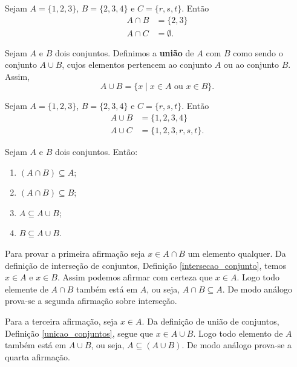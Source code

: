 \begin{exemplo}
	Sejam $A = \{1, 2, 3\}$, $B = \{2, 3, 4\}$ e $C = \{r, s, t\}$. Então
	\begin{align*}
		A \cap B &= \{2, 3\}\\
		A \cap C &= \emptyset.
	\end{align*}
\end{exemplo}

\begin{definicao}[Uni{\~a}o]\label{unicao_conjuntos}
Sejam $A$ e $B$ dois conjuntos. Definimos a \textbf{uni{\~a}o} de $A$ com $B$ como sendo o conjunto $A \cup B$, cujos elementos pertencem ao conjunto $A$ ou ao conjunto $B$. Assim,
\[
A \cup B = \{x \mid x \in A \mbox{ ou } x \in B\}.
\]
\end{definicao}

\begin{exemplo}
	Sejam $A = \{1, 2, 3\}$, $B = \{2, 3, 4\}$ e $C = \{r, s, t\}$. Então
	\begin{align*}
		A \cup B &= \{1,2,3,4\}\\
		A \cup C &= \{1,2,3,r,s,t\}.
	\end{align*}
\end{exemplo}

\begin{proposicao} Sejam $A$ e $B$ dois conjuntos. Ent{\~a}o:
\begin{enumerate}
\item $(A \cap B) \subseteq A$;
\item $(A \cap B) \subseteq B$;
\item $A \subseteq A \cup B$;
\item $B \subseteq A \cup B$.
\end{enumerate}
\end{proposicao}
\begin{prova}
	Para provar a primeira afirmação seja $x \in A \cap B$ um elemento qualquer. Da defini\c{c}\~ao de interse\c{c}\~ao de conjuntos, Definição \ref{intersecao_conjunto}, temos $x \in A$ e $x \in B$. Assim podemos afirmar com certeza que $x \in A$. Logo todo elemente de $A \cap B$ também está em $A$, ou seja, $A \cap B \subseteq A$. De modo análogo prova-se a segunda afirmação sobre interseção.

	Para a terceira afirmação, seja $x \in A$. Da definição de união de conjuntos, Definição \ref{unicao_conjuntos}, segue que $x \in A \cup B$. Logo todo elemento de $A$ também está em $A \cup B$, ou seja, $A \subseteq (A \cup B)$. De modo análogo prova-se a quarta afirmação.
\end{prova}

